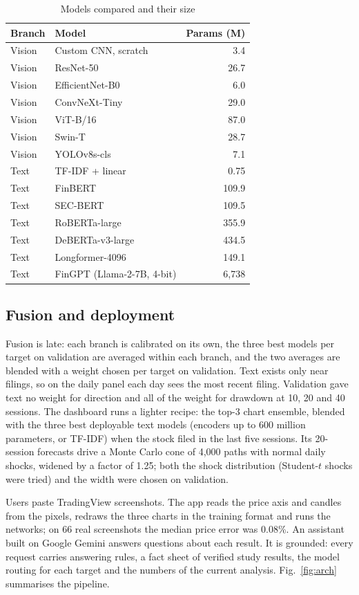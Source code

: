 \documentclass[conference]{IEEEtran}
\begin{document}
\begin{table}[t]
\caption{Models compared and their size}
\label{tab:models}
\centering
\begin{tabular}{llr}
\toprule
Branch & Model & Params (M) \\
\midrule
Vision & Custom CNN, scratch & 3.4 \\
Vision & ResNet-50 & 26.7 \\
Vision & EfficientNet-B0 & 6.0 \\
Vision & ConvNeXt-Tiny & 29.0 \\
Vision & ViT-B/16 & 87.0 \\
Vision & Swin-T & 28.7 \\
Vision & YOLOv8s-cls & 7.1 \\
Text & TF-IDF + linear & 0.75 \\
Text & FinBERT & 109.9 \\
Text & SEC-BERT & 109.5 \\
Text & RoBERTa-large & 355.9 \\
Text & DeBERTa-v3-large & 434.5 \\
Text & Longformer-4096 & 149.1 \\
Text & FinGPT (Llama-2-7B, 4-bit) & 6,738 \\
\bottomrule
\end{tabular}
\end{table}

\subsection{Fusion and deployment}

Fusion is late: each branch is calibrated on its own, the three best models per target on validation are averaged within each branch, and the two averages are blended with a weight chosen per target on validation. Text exists only near filings, so on the daily panel each day sees the most recent filing. Validation gave text no weight for direction and all of the weight for drawdown at 10, 20 and 40 sessions. The dashboard runs a lighter recipe: the top-3 chart ensemble, blended with the three best deployable text models (encoders up to 600 million parameters, or TF-IDF) when the stock filed in the last five sessions. Its 20-session forecasts drive a Monte Carlo cone of 4,000 paths with normal daily shocks, widened by a factor of 1.25; both the shock distribution (Student-$t$ shocks were tried) and the width were chosen on validation.

Users paste TradingView screenshots. The app reads the price axis and candles from the pixels, redraws the three charts in the training format and runs the networks; on 66 real screenshots the median price error was 0.08\%. An assistant built on Google Gemini answers questions about each result. It is grounded: every request carries answering rules, a fact sheet of verified study results, the model routing for each target and the numbers of the current analysis. Fig.~\ref{fig:arch} summarises the pipeline.
\end{document}
